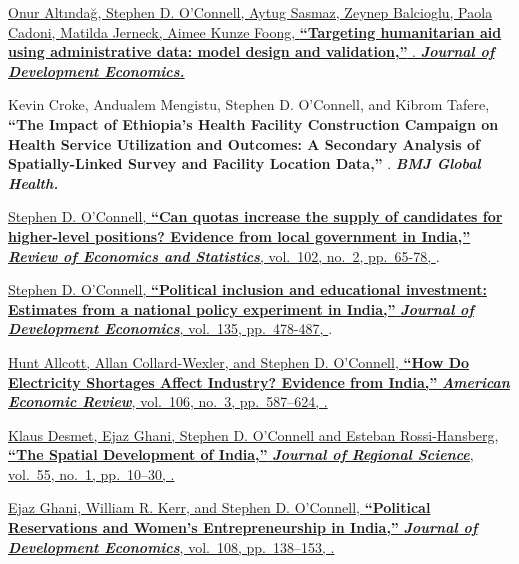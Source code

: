\documentclass[letterpaper,10pt,oneside]{article}
\begin{document}
\begin{body}
\BigEntryGap
\href{https://www.stephenoconnell.org/files/AOSBCJK_TargetingRefugees.pdf}
{Onur Altındağ, Stephen D. O'Connell, Aytug Sasmaz, Zeynep Balcioglu, Paola Cadoni, Matilda Jerneck, Aimee Kunze Foong, \textbf{``Targeting humanitarian aid using administrative data: model design and validation,''} . \textbf{\textit{Journal of Development Economics.}}} 

\BigEntryGap
Kevin Croke, Andualem Mengistu, Stephen D. O’Connell, and Kibrom Tafere, \textbf{``The Impact of Ethiopia's Health Facility Construction Campaign on Health Service Utilization and Outcomes: A Secondary Analysis of Spatially-Linked Survey and Facility Location Data,''} . \textbf{\textit{BMJ Global Health.}}

\BigEntryGap
\href{https://www.mitpressjournals.org/doi/pdf/10.1162/rest_a_00802}
{Stephen D. O'Connell, \textbf{``Can quotas increase the supply of candidates for higher-level positions? Evidence from local government in India,''} \textbf{\textit{Review of Economics and Statistics}}, vol.~102, no.~2, pp.~65-78, }.

\BigEntryGap

\href{https://doi.org/10.1016/j.jdeveco.2018.08.004}
{Stephen D. O'Connell, \textbf{``Political inclusion and educational investment: Estimates from a national policy experiment in India,''}
\textbf{\textit{Journal of Development Economics}}, vol.~135, pp.~478-487, }.


\BigEntryGap
\href{http://www.stephenoconnell.org/files/ACWO2016_AER_Shortages.pdf}
{Hunt Allcott, Allan Collard-Wexler, and Stephen D. O'Connell,
\textbf{``How Do Electricity Shortages Affect Industry? Evidence from India,''}
\textbf{\textit{American Economic Review}},
vol.~106,
no.~3,
pp.~587--624,
.}


\BigEntryGap
\href{http://elibrary.worldbank.org/doi/abs/10.1596/1813-9450-6060}
{Klaus Desmet, Ejaz Ghani, Stephen D. O'Connell and Esteban Rossi-Hansberg,
\textbf{``The Spatial Development of India,''}
\textbf{\textit{Journal of Regional Science}},
vol.~55,
no.~1,
pp.~10--30,
.}

\BigEntryGapNoBreak

\href{http://www.stephenoconnell.org/files/GKO_ReservationsEntry.pdf}
{Ejaz Ghani, William R. Kerr, and Stephen D. O'Connell,
\textbf{``Political Reservations and Women's Entrepreneurship in India,''}
\textbf{\textit{Journal of Development Economics}},
vol.~108,
pp.~138--153,
.}



\end{body}
\end{document}
